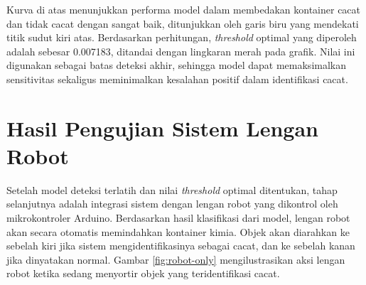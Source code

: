 Kurva di atas menunjukkan performa model dalam membedakan kontainer
cacat dan tidak cacat dengan sangat baik, ditunjukkan oleh garis biru
yang mendekati titik sudut kiri atas. Berdasarkan perhitungan,
\textit{threshold} optimal yang diperoleh adalah sebesar 0.007183, ditandai
dengan lingkaran merah pada grafik. Nilai ini digunakan sebagai batas
deteksi akhir, sehingga model dapat memaksimalkan sensitivitas
sekaligus meminimalkan kesalahan positif dalam identifikasi cacat.

\vspace{1em}

\section{Hasil Pengujian Sistem Lengan Robot}

Setelah model deteksi terlatih dan nilai \textit{threshold} optimal
ditentukan, tahap selanjutnya adalah integrasi sistem dengan lengan
robot yang dikontrol oleh mikrokontroler Arduino. Berdasarkan hasil
klasifikasi dari model, lengan robot akan secara otomatis memindahkan
kontainer kimia. Objek akan diarahkan ke sebelah kiri jika sistem
mengidentifikasinya sebagai cacat, dan ke sebelah kanan jika
dinyatakan normal. Gambar \ref{fig:robot-only} mengilustrasikan aksi lengan
robot ketika sedang menyortir objek yang teridentifikasi cacat.

